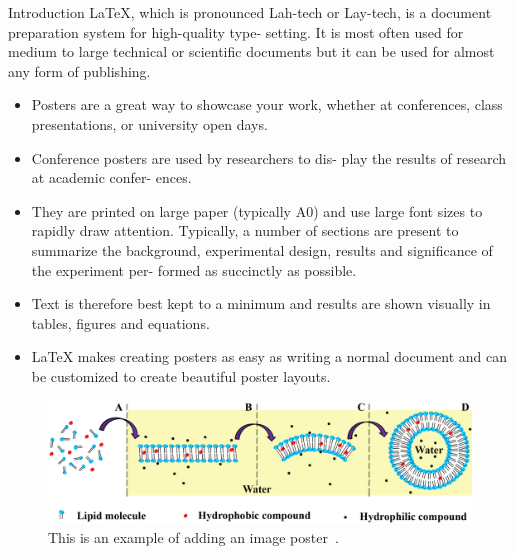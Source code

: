\documentclass[20pt]{beamer}
\begin{document}
\vspace*{-2cm}
\begin{frame}[t]
\begin{columns}[t]

\begin{column}{0.32\linewidth}
\begin{block}{Introduction}
LaTeX, which is pronounced Lah-tech or Lay-tech, is
a document preparation system for high-quality type-
setting. It is most often used for medium to large
technical or scientific documents but it can be used
for almost any form of publishing.

\begin{itemize}
	\item Posters are a great way to showcase your work,
	whether at conferences, class presentations, or
	university open days.
	
	\item Conference posters are used by researchers to dis-
	play the results of research at academic confer-
	ences.
	
	\item They are printed on large paper (typically A0) and
	use large font sizes to rapidly draw attention.
	Typically, a number of sections are present to
	summarize the background, experimental design,
	results and significance of the experiment per-
	formed as succinctly as possible.
	
	\item Text is therefore best kept to a minimum and
	results are shown visually in tables, figures and
	equations.
	
	\item LaTeX makes creating posters as easy as writing
	a normal document and can be customized to
	create beautiful poster layouts.	
\end{itemize}

\vskip2cm 

\begin{figure}
	\includegraphics[width=\linewidth]{intro}
	\caption{This is an example of adding an image poster~\cite{hasc18,has2019comprehensive}.}
\end{figure}	
\end{block}		
	

\end{column}
\end{columns}
\end{frame}
\end{document}
